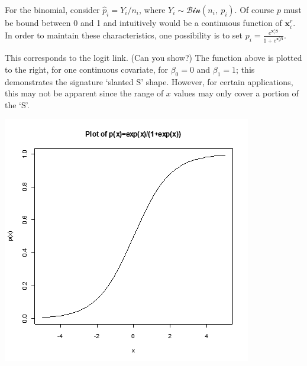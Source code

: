 \documentclass[
  9pt,
  ignorenonframetext,
]{beamer}
\begin{document}
\begin{frame}{}
\protect\hypertarget{section}{}
For the binomial, consider \(\hat p_i=Y_i/n_i\), where
\(Y_i \sim \mathcal {Bin}(n_i,\ p_i)\). Of course \(p\) must be bound
between 0 and 1 and intuitively would be a continuous function of
\(\pmb x_i^r\). In order to maintain these characteristics, one
possibility is to set
\(p_i=\frac {e^{\pmb x_i^r \pmb \beta}} {1+e^{\pmb x_i^r \pmb \beta} }.\)

This corresponds to the logit link. (Can you show?) The function above
is plotted to the right, for one continuous covariate, for
\(\beta_0 = 0\) and \(\beta_1=1\); this demonstrates the signature
`slanted S' shape. However, for certain applications, this may not be
apparent since the range of \(x\) values may only cover a portion of the
`S'.

\begin{center}\includegraphics[width=0.5\linewidth]{figs_L14/f2} \end{center}
\end{frame}
\end{document}
